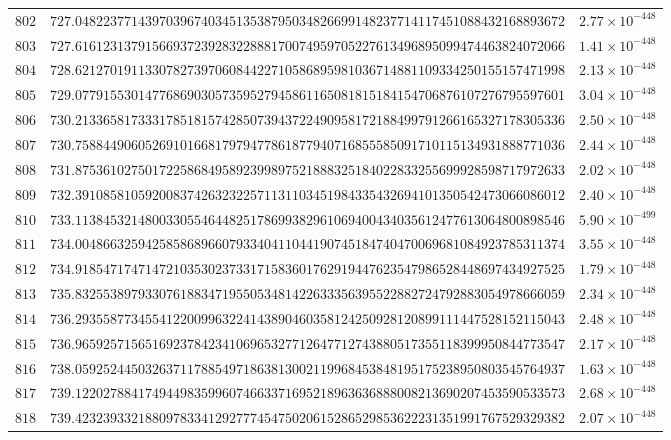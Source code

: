 \documentclass[12pt,reqno]{amsart}
\theoremstyle{remark}
\begin{document}
\begin{longtable}{clc}
$802$ & $727.0482237714397039674034513538795034826699148237714117451088432168893672$ & $2.77\times 10^{-448}$ \\
$803$ & $727.6161231379156693723928322888170074959705227613496895099474463824072066$ & $1.41\times 10^{-448}$ \\
$804$ & $728.6212701911330782739706084422710586895981036714881109334250155157471998$ & $2.13\times 10^{-448}$ \\
$805$ & $729.0779155301477686903057359527945861165081815184154706876107276795597601$ & $3.04\times 10^{-448}$ \\
$806$ & $730.2133658173331785181574285073943722490958172188499791266165327178305336$ & $2.50\times 10^{-448}$ \\
$807$ & $730.7588449060526910166817979477861877940716855585091710115134931888771036$ & $2.44\times 10^{-448}$ \\
$808$ & $731.8753610275017225868495892399897521888325184022833255699928598717972633$ & $2.02\times 10^{-448}$ \\
$809$ & $732.3910858105920083742632322571131103451984335432694101350542473066086012$ & $2.40\times 10^{-448}$ \\
$810$ & $733.1138453214800330554644825178699382961069400434035612477613064800898546$ & $5.90\times 10^{-499}$ \\
$811$ & $734.0048663259425858689660793340411044190745184740470069681084923785311374$ & $3.55\times 10^{-448}$ \\
$812$ & $734.9185471747147210353023733171583601762919447623547986528448697434927525$ & $1.79\times 10^{-448}$ \\
$813$ & $735.8325538979330761883471955053481422633356395522882724792883054978666059$ & $2.34\times 10^{-448}$ \\
$814$ & $736.2935587734554122009963224143890460358124250928120899111447528152115043$ & $2.48\times 10^{-448}$ \\
$815$ & $736.9659257156516923784234106965327712647712743880517355118399950844773547$ & $2.17\times 10^{-448}$ \\
$816$ & $738.0592524450326371178854971863813002119968453848195175238950803545764937$ & $1.63\times 10^{-448}$ \\
$817$ & $739.1220278841749449835996074663371695218963636888008213690207453590533573$ & $2.68\times 10^{-448}$ \\
$818$ & $739.4232393321880978334129277745475020615286529853622231351991767529329382$ & $2.07\times 10^{-448}$ \\

\end{longtable}
\end{document}
